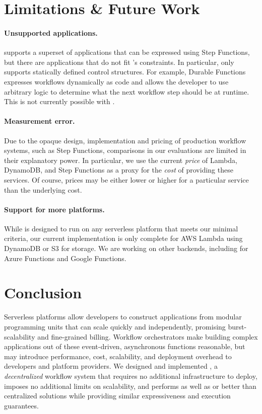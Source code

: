 \section{Limitations \& Future Work}\label{sec:limitations}

\paragraph{Unsupported applications.} \name{} supports a superset of
applications that can be expressed using Step Functions, but there are
applications that do not fit \name{}'s constraints. In particular, \name{} only
supports statically defined control structures. For example, Durable Functions
expresses workflows dynamically as code and allows the developer to use
arbitrary logic to determine what the next workflow step should be at runtime.
This is not currently possible with \name{}.

\paragraph{Measurement error.} Due to the opaque design, implementation and
pricing of production workflow systems, such as Step Functions, comparisons in
our evaluations are limited in their explanatory power. In particular, we use
the current \emph{price} of Lambda, DynamoDB, and Step Functions as a proxy for
the \emph{cost} of providing these services. Of course, prices may be either
lower or higher for a particular service than the underlying cost.

\paragraph{Support for more platforms.} While \name{} is designed
to run on any serverless platform that meets our minimal criteria, our current
implementation is only complete for AWS Lambda using DynamoDB or S3 for storage.
We are working on other backends, including for Azure Functions and Google
Functions.

\section{Conclusion}\label{sec:conclusion}

Serverless platforms allow developers to construct applications from modular
programming units that can scale quickly and independently, promising
burst-scalability and fine-grained billing. Workflow orchestrators make building
complex applications out of these event-driven, asynchronous functions
reasonable, but may introduce performance, cost, scalability, and deployment
overhead to developers and platform providers. We designed and implemented
\name{}, a \emph{decentralized} workflow system that requires no additional
infrastructure to deploy, imposes no additional limits on scalability, and
performs as well as or better than centralized solutions while providing
similar expressiveness and execution guarantees.

